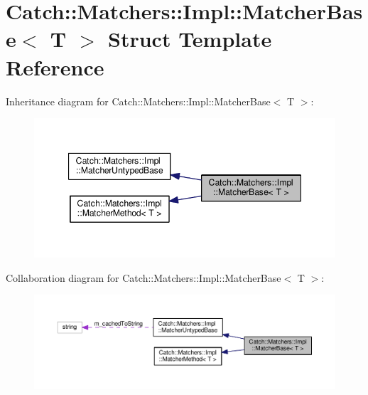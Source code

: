 \hypertarget{structCatch_1_1Matchers_1_1Impl_1_1MatcherBase}{}\section{Catch\+:\+:Matchers\+:\+:Impl\+:\+:Matcher\+Base$<$ T $>$ Struct Template Reference}
\label{structCatch_1_1Matchers_1_1Impl_1_1MatcherBase}


Inheritance diagram for Catch\+:\+:Matchers\+:\+:Impl\+:\+:Matcher\+Base$<$ T $>$\+:
\nopagebreak
\begin{figure}[H]
\begin{center}
\leavevmode
\includegraphics[width=347pt]{structCatch_1_1Matchers_1_1Impl_1_1MatcherBase__inherit__graph}
\end{center}
\end{figure}


Collaboration diagram for Catch\+:\+:Matchers\+:\+:Impl\+:\+:Matcher\+Base$<$ T $>$\+:
\nopagebreak
\begin{figure}[H]
\begin{center}
\leavevmode
\includegraphics[width=350pt]{structCatch_1_1Matchers_1_1Impl_1_1MatcherBase__coll__graph}
\end{center}
\end{figure}
